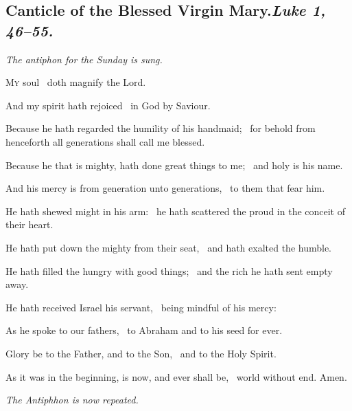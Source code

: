 \documentclass[12pt]{article} %
\newenvironment{psalmtext}{\leftskip 0.25in}{\vspace{2 mm}}
\newenvironment{rubric}{\vspace{2 mm}\color{benred8} \itshape \leftskip 0in \setlength{\parindent}{0.25in}}{\vspace{2 mm}}
\let\oldgresixstar\gresixstar
\renewcommand{\gresixstar}{\textcolor{benred8}{\oldgresixstar}}
\let\oldgrealtcross\grealtcross
\renewcommand{\grealtcross}{\textcolor{benred8}{\oldgrealtcross}}
\def\capitulumSpace{\hspace{20 mm}}
\begin{document}
\begin{pages}
\begin{Rightside}
\subsection*{Canticle of the Blessed Virgin Mary.\capitulumSpace \emph{Luke 1, 46--55.}}

\pend\pstart

\begin{rubric}
The antiphon for the Sunday is sung.

\end{rubric}

\pend\pstart

\begin{psalmtext}
\lettrine[lhang=0.70]{M}{y} soul \grealtcross\ doth magnify the Lord.

\hspace*{9.5 mm}And my spirit hath rejoiced \gresixstar\ in God by Saviour.

Because he hath regarded the humility of his handmaid; \gresixstar\ for behold from henceforth all generations shall call me blessed.

Because he that is mighty, hath done great things to me; \gresixstar\ and holy is his name.

And his mercy is from generation unto generations, \gresixstar\ to them that fear him.

He hath shewed might in his arm: \gresixstar\ he hath scattered the proud in the conceit of their heart.

He hath put down the mighty from their seat, \gresixstar\ and hath exalted the humble.

He hath filled the hungry with good things; \gresixstar\ and the rich he hath sent empty away.

He hath received Israel his servant, \gresixstar\ being mindful of his mercy:

As he spoke to our fathers, \gresixstar\ to Abraham and to his seed for ever.

Glory be to the Father, and to the Son, \gresixstar\ and to the Holy Spirit.

As it was in the beginning, is now, and ever shall be, \gresixstar\ world without end. Amen.

\end{psalmtext}

\pend\pstart

\begin{rubric}
The Antiphhon is now repeated.

\end{rubric}


\end{Rightside}
\end{pages}
\end{document}
